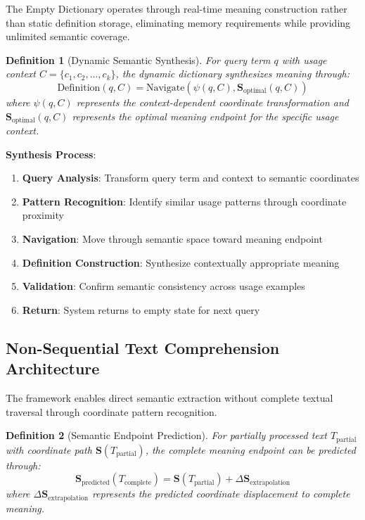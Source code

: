 \documentclass[12pt,a4paper]{article}
\newtheorem{definition}{Definition}
\begin{document}
The Empty Dictionary operates through real-time meaning construction rather than static definition storage, eliminating memory requirements while providing unlimited semantic coverage.

\begin{definition}[Dynamic Semantic Synthesis]
For query term $q$ with usage context $C = \{c_1, c_2, ..., c_k\}$, the dynamic dictionary synthesizes meaning through:
\begin{equation}
\text{Definition}(q, C) = \text{Navigate}(\psi(q, C), \mathbf{S}_{\text{optimal}}(q, C))
\end{equation}
where $\psi(q, C)$ represents the context-dependent coordinate transformation and $\mathbf{S}_{\text{optimal}}(q, C)$ represents the optimal meaning endpoint for the specific usage context.
\end{definition}

\textbf{Synthesis Process}:
\begin{enumerate}
\item \textbf{Query Analysis}: Transform query term and context to semantic coordinates
\item \textbf{Pattern Recognition}: Identify similar usage patterns through coordinate proximity
\item \textbf{Navigation}: Move through semantic space toward meaning endpoint
\item \textbf{Definition Construction}: Synthesize contextually appropriate meaning
\item \textbf{Validation}: Confirm semantic consistency across usage examples
\item \textbf{Return}: System returns to empty state for next query
\end{enumerate}

\subsection{Non-Sequential Text Comprehension Architecture}

The framework enables direct semantic extraction without complete textual traversal through coordinate pattern recognition.

\begin{definition}[Semantic Endpoint Prediction]
For partially processed text $T_{\text{partial}}$ with coordinate path $\mathbf{S}(T_{\text{partial}})$, the complete meaning endpoint can be predicted through:
\begin{equation}
\mathbf{S}_{\text{predicted}}(T_{\text{complete}}) = \mathbf{S}(T_{\text{partial}}) + \Delta\mathbf{S}_{\text{extrapolation}}
\end{equation}
where $\Delta\mathbf{S}_{\text{extrapolation}}$ represents the predicted coordinate displacement to complete meaning.
\end{definition}
\end{document}
